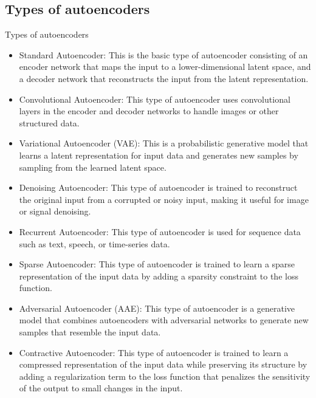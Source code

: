 %
%
%

\subsection{Types of autoencoders}

\begin{frame}{Types of autoencoders}

    \begin{itemize}
        \item
        Standard Autoencoder: 
        This is the basic type of autoencoder consisting of an encoder 
        network that maps the input to a lower-dimensional latent space, 
        and a decoder network that reconstructs the input from the latent representation.
        \item
        Convolutional Autoencoder: This type of autoencoder uses convolutional layers in the encoder and decoder networks to handle images or other structured data.
        \item
        Variational Autoencoder (VAE): This is a probabilistic generative model that learns a latent representation for input data and generates new samples by sampling from the learned latent space.
        \item
        Denoising Autoencoder: This type of autoencoder is trained to reconstruct the original input from a corrupted or noisy input, making it useful for image or signal denoising.
        \item
        Recurrent Autoencoder: This type of autoencoder is used for sequence data such as text, speech, or time-series data.
        \item
        Sparse Autoencoder: This type of autoencoder is trained to learn a sparse representation of the input data by adding a sparsity constraint to the loss function.
        \item
        Adversarial Autoencoder (AAE): This type of autoencoder is a generative model that combines autoencoders with adversarial networks to generate new samples that resemble the input data.
        \item
        Contractive Autoencoder: This type of autoencoder is trained to learn a compressed representation of the input data while preserving its structure by adding a regularization term to the loss function that penalizes the sensitivity of the output to small changes in the input.
    \end{itemize}

\end{frame}

